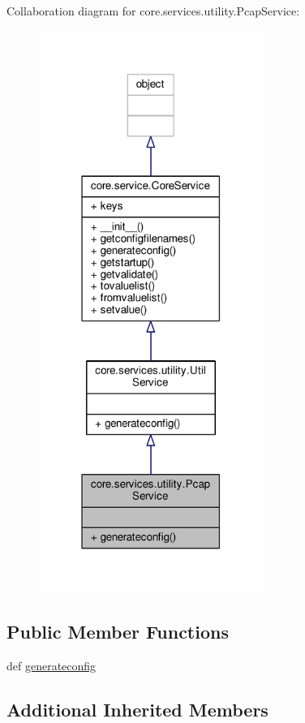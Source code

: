 Collaboration diagram for core.\+services.\+utility.\+Pcap\+Service\+:
\nopagebreak
\begin{figure}[H]
\begin{center}
\leavevmode
\includegraphics[width=207pt]{classcore_1_1services_1_1utility_1_1_pcap_service__coll__graph}
\end{center}
\end{figure}
\subsection*{Public Member Functions}
\begin{DoxyCompactItemize}
\item 
def \hyperlink{classcore_1_1services_1_1utility_1_1_pcap_service_abad7ff2924ea93b68587ae3c605b0689}{generateconfig}
\end{DoxyCompactItemize}
\subsection*{Additional Inherited Members}


